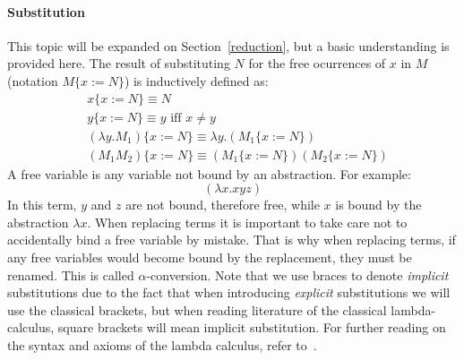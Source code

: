 \documentclass[12pt]{article}
\begin{document}
\paragraph{Substitution} This topic will be expanded on Section~\ref{reduction}, but a basic understanding is provided here.
The result of substituting $N$ for the free ocurrences of $x$ in $M$ (notation $M \{ x:= N \} $) is inductively defined as:
\begin{equation*}
  \begin{split}
    & x\{ x := N \} \equiv N \\
    & y \{ x := N \} \equiv y \text{ iff } x \neq y \\
    & (\lambda y.M_{1}) \{ x:=N \} \equiv \lambda y. ( M_{1} \{ x:=N \} ) \\
    & (M_{1}M_{2}) \{ x:=N \} \equiv (M_{1}\{ x:=N \} )(M_{2} \{ x:=N \} )
  \end{split}
\end{equation*}
A free variable is any variable not bound by an abstraction. For example:
\begin{equation*}
  (\lambda x . x y z )
\end{equation*}
In this term, $y$ and $z$ are not bound, therefore free, while $x$ is bound by the abstraction $\lambda x$.
When replacing terms it is important to take care not to accidentally bind a free variable by mistake. That is why when replacing terms, if any free variables would become bound by the replacement, they must be renamed. This is called $\alpha$-conversion.
Note that we use braces to denote \textit{implicit} substitutions due to the fact that when introducing \textit{explicit} substitutions we will use the classical brackets, but when reading literature of the classical lambda-calculus, square brackets will mean implicit substitution.
For further reading on the syntax and axioms of the lambda calculus, refer to~\cite{barendregt1984lambda}.
\end{document}
